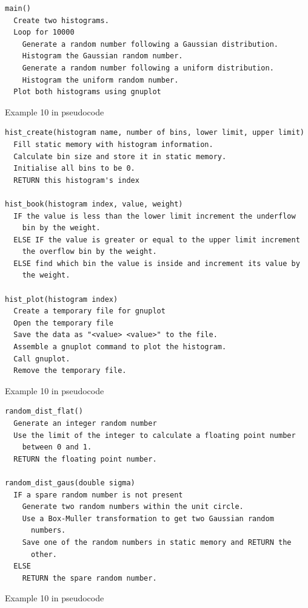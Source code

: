 \documentclass[11pt]{scrartcl}
\begin{document}
\begin{pseudocode}[h]
\begin{verbatim}
main()
  Create two histograms.
  Loop for 10000
    Generate a random number following a Gaussian distribution.
    Histogram the Gaussian random number.
    Generate a random number following a uniform distribution.
    Histogram the uniform random number.
  Plot both histograms using gnuplot
\end{verbatim}
\caption{Example 10 in pseudocode \label{pseudo:ex10_main}}
\end{pseudocode}

\begin{pseudocode}[h]
\begin{verbatim}
hist_create(histogram name, number of bins, lower limit, upper limit)
  Fill static memory with histogram information.
  Calculate bin size and store it in static memory.
  Initialise all bins to be 0.
  RETURN this histogram's index

hist_book(histogram index, value, weight)
  IF the value is less than the lower limit increment the underflow
    bin by the weight.
  ELSE IF the value is greater or equal to the upper limit increment
    the overflow bin by the weight.
  ELSE find which bin the value is inside and increment its value by
    the weight.

hist_plot(histogram index)
  Create a temporary file for gnuplot
  Open the temporary file
  Save the data as "<value> <value>" to the file.
  Assemble a gnuplot command to plot the histogram.
  Call gnuplot.
  Remove the temporary file.
\end{verbatim}
\caption{Example 10 in pseudocode \label{pseudo:ex10_histogram}}
\end{pseudocode}

\begin{pseudocode}[h]
\begin{verbatim}
random_dist_flat()
  Generate an integer random number
  Use the limit of the integer to calculate a floating point number
    between 0 and 1.
  RETURN the floating point number.

random_dist_gaus(double sigma)
  IF a spare random number is not present
    Generate two random numbers within the unit circle.
    Use a Box-Muller transformation to get two Gaussian random
      numbers. 
    Save one of the random numbers in static memory and RETURN the
      other.
  ELSE
    RETURN the spare random number. 
\end{verbatim}
\caption{Example 10 in pseudocode \label{pseudo:ex10_random_dist}}
\end{pseudocode}
\end{document}
